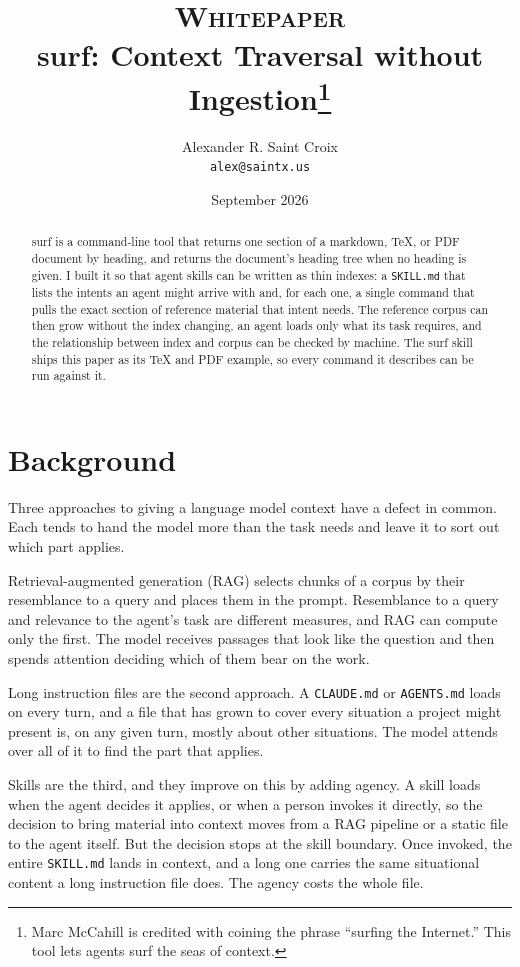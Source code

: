 \documentclass[11pt]{article}
\title{\normalsize\textsc{Whitepaper}\\[0.6em]
\LARGE surf: Context Traversal without Ingestion\thanks{Marc McCahill is
credited with coining the phrase ``surfing the Internet.'' This tool lets agents
surf the seas of context.}}
\author{Alexander R. Saint Croix\\\texttt{alex@saintx.us}}
\date{September 2026}
\begin{document}
\maketitle

\begin{abstract}
surf is a command-line tool that returns one section of a markdown, TeX, or PDF
document by heading, and returns the document's heading tree when no heading is
given. I built it so that agent skills can be written as thin indexes: a
\texttt{SKILL.md} that lists the intents an agent might arrive with and, for each
one, a single command that pulls the exact section of reference material that
intent needs. The reference corpus can then grow without the index changing, an
agent loads only what its task requires, and the relationship between index and
corpus can be checked by machine. The surf skill ships this paper as its TeX and
PDF example, so every command it describes can be run against it.
\end{abstract}

\section{Background}

Three approaches to giving a language model context have a defect in common.
Each tends to hand the model more than the task needs and leave it to sort out
which part applies.

Retrieval-augmented generation (RAG) selects chunks of a corpus by their
resemblance to a query and places them in the prompt. Resemblance to a query and
relevance to the agent's task are different measures, and RAG can compute only
the first. The model receives passages that look like the question and then
spends attention deciding which of them bear on the work.

Long instruction files are the second approach. A \texttt{CLAUDE.md} or
\texttt{AGENTS.md} loads on every turn, and a file that has grown to cover every
situation a project might present is, on any given turn, mostly about other
situations. The model attends over all of it to find the part that applies.

Skills are the third, and they improve on this by adding agency. A skill loads
when the agent decides it applies, or when a person invokes it directly, so the
decision to bring material into context moves from a RAG pipeline or a static
file to the agent itself. But the decision stops at the skill boundary. Once
invoked, the entire \texttt{SKILL.md} lands in context, and a long one carries
the same situational content a long instruction file does. The agency costs the
whole file.
\end{document}
